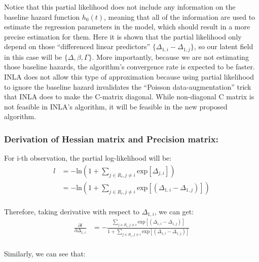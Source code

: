 \documentclass[]{article}
\begin{document}
Notice that this partial likelihood does not include any information on
the baseline hazard function \(h_0(t)\), meaning that all of the
information are used to estimate the regression parameters in the model,
which should result in a more precise estimation for them. Here it is
shown that the partial likelihood only depend on those ``differenced
linear predictors'' \(\{\Delta_{1,i}-\Delta_{1,j}\}\), so our latent
field in this case will be \(\{ \Delta,\beta,\Gamma \}\). More
importantly, because we are not estimating those baseline hazards, the
algorithm's convergence rate is expected to be faster. INLA does not
allow this type of approximation because using partial likelihood to
ignore the baseline hazard invalidates the ``Poisson data-augmentation''
trick that INLA does to make the C-matrix diagonal. While non-diagonal C
matrix is not feasible in INLA's algorithm, it will be feasible in the
new proposed algorithm.

\hypertarget{derivation-of-hessian-matrix-and-precision-matrix}{%
\subsubsection{Derivation of Hessian matrix and Precision
matrix:}\label{derivation-of-hessian-matrix-and-precision-matrix}}

For i-th observation, the partial log-likelihood will be:
\begin{equation}\begin{aligned}\label{eqn:ithPart}
l &= -\text{ln}(1+{\sum_{j\in R_i, j \ne i}^{}\text{exp}[\Delta_{j,i}]}) \\
  &= -\text{ln}(1+{\sum_{j\in R_i, j \ne i}^{}\text{exp}[(\Delta_{1,i}-\Delta_{1,j})]})\\
\end{aligned}\end{equation}

Therefore, taking derivative with respect to \(\Delta_{1,i}\), we can
get: \begin{equation}\begin{aligned}\label{eqn:derivofPart}
\frac{\partial l}{\partial \Delta_{1,i}} &= -\frac{\sum_{j\in R_i, j \ne i}^{}{}\text{exp}[(\Delta_{1,i}-\Delta_{1,j})]}{1+\sum_{j\in R_i, j \ne i}^{}{}\text{exp}[(\Delta_{1,i}-\Delta_{1,j})]} \\
\end{aligned}\end{equation}

Similarly, we can see that:
\end{document}
